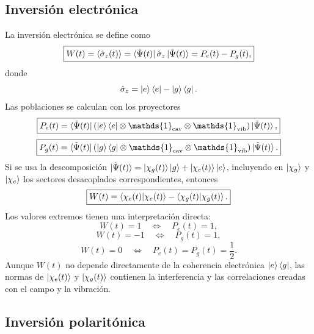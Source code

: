 \documentclass[11pt]{article}
\newcommand{\Id}{\mathds{1}}
\begin{document}
\subsection{Inversi\'on electr\'onica}

La inversi\'on electr\'onica se define como
\begin{equation}
  \boxed{
  W(t)
  =
  \langle\hat\sigma_z(t)\rangle
  =
  \bra{\tilde\Psi(t)}
  \hat\sigma_z
  \ket{\tilde\Psi(t)}
  =
  P_e(t)-P_g(t),
  }
\end{equation}
donde
\begin{equation}
  \hat\sigma_z
  =
  \ket e\bra e-\ket g\bra g.
\end{equation}
Las poblaciones se calculan con los proyectores
\begin{equation}
  \boxed{
  P_e(t)
  =
  \bra{\tilde\Psi(t)}
  \left(
  \ket e\bra e
  \otimes\Id_{\mathrm{cav}}
  \otimes\Id_{\mathrm{vib}}
  \right)
  \ket{\tilde\Psi(t)},
  }
\end{equation}
\begin{equation}
  \boxed{
  P_g(t)
  =
  \bra{\tilde\Psi(t)}
  \left(
  \ket g\bra g
  \otimes\Id_{\mathrm{cav}}
  \otimes\Id_{\mathrm{vib}}
  \right)
  \ket{\tilde\Psi(t)}.
  }
\end{equation}
Si se usa la descomposici\'on
$\ket{\tilde\Psi(t)}=\ket{\chi_g(t)}\ket g+\ket{\chi_e(t)}\ket e$,
incluyendo en $\ket{\chi_g}$ y $\ket{\chi_e}$ los sectores desacoplados
correspondientes, entonces
\begin{equation}
  \boxed{
  W(t)
  =
  \braket{\chi_e(t)|\chi_e(t)}
  -
  \braket{\chi_g(t)|\chi_g(t)}.
  }
\end{equation}
Los valores extremos tienen una interpretaci\'on directa:
\begin{equation}
  W(t)=1
  \quad\Longleftrightarrow\quad
  P_e(t)=1,
\end{equation}
\begin{equation}
  W(t)=-1
  \quad\Longleftrightarrow\quad
  P_g(t)=1,
\end{equation}
\begin{equation}
  W(t)=0
  \quad\Longleftrightarrow\quad
  P_e(t)=P_g(t)=\frac12.
\end{equation}
Aunque $W(t)$ no depende directamente de la coherencia electr\'onica
$\ket e\bra g$, las normas de $\ket{\chi_e(t)}$ y $\ket{\chi_g(t)}$ contienen
la interferencia y las correlaciones creadas con el campo y la vibraci\'on.

\subsection{Inversi\'on polarit\'onica}
\end{document}
